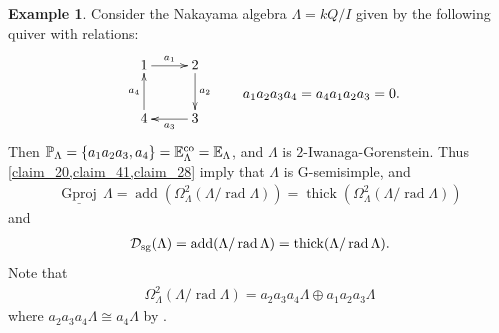 \documentclass[12pt]{amsart}
\numberwithin{equation}{subsection}
\theoremstyle{plain}
\theoremstyle{definition}
\newtheorem{example}[theorem]{Example}
\newcommand{\rad}{\operatorname{rad}}
\newcommand{\add}{\operatorname{add}}
\newcommand{\sGproj}{\underline{\operatorname{Gproj}}\,}
\newcommand{\thick}{\operatorname{thick}}
\renewcommand{\P}{\operatorname{\mathbb{P}}\nolimits}
\renewcommand{\L}{\Lambda}
\newcommand{\D}{\mathcal{D}}
\newcommand{\Eco}{\mathbb{E}^{\rm co}}
\newcommand{\E}{\mathbb{E}}
\begin{document}
\begin{example}\label{example_4}
Consider the Nakayama algebra $\L=kQ/I$ given by the following quiver with relations:
\begin{align}
\raisebox{8mm}{
    \xymatrix@R=9mm@C=9mm{
    1 \ar[r]^-{a_1} & 2 \ar[d]^-{a_2}\\
    4 \ar[u]^-{a_4} & 3 \ar[l]^-{a_3}\\
    }}
    \qquad a_1 a_2 a_3 a_4 = a_4 a_1 a_2 a_3 =0. 
\end{align}
Then $\P_\L=\{ a_1 a_2 a_3, a_4 \} = \Eco_\L = \E_\L$, 
and $\L$ is $2$-Iwanaga-Gorenstein.
Thus  \cref{claim_20,claim_41,claim_28} imply that $\L$ is G-semisimple, and 
\begin{align}
\sGproj\L=\add(\Omega_\L^{2}(\L/\rad\L))=\thick(\Omega_\L^{2}(\L/\rad\L))
\end{align}
and
\begin{align}
 \D_{\rm sg}(\L)=\add(\L/\rad\L)=\thick(\L/\rad\L).
\end{align}
Note that 
\begin{align}
\Omega_\L^{2}(\L/\rad\L) = a_2 a_3 a_4\L \oplus a_1 a_2 a_3\L
\end{align}
where $a_2 a_3 a_4\L \cong a_4\L$ by \cite[Proposition 4.6]{Chen-Shen-Zhou_2018}. 
\end{example}





\end{document}
